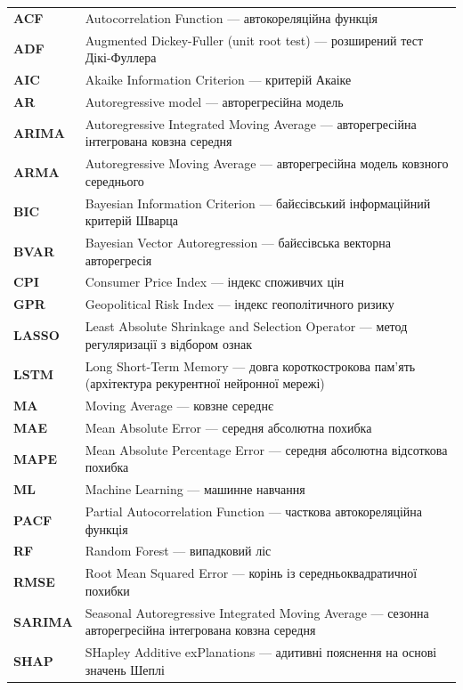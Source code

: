 \documentclass{bachelor_thesis}
\begin{document}
{
\noindent\begin{longtable}{@{}>{\bfseries}p{2.5cm}@{\hspace{0.5cm}}p{\dimexpr\textwidth-3.2cm\relax}@{}}
ACF      & Autocorrelation Function --- автокореляційна функція \\
ADF      & Augmented Dickey-Fuller (unit root test) --- розширений тест Дікі-Фуллера \\
AIC      & Akaike Information Criterion --- критерій Акаіке \\
AR       & Autoregressive model --- авторегресійна модель \\
ARIMA    & Autoregressive Integrated Moving Average --- авторегресійна інтегрована ковзна середня \\
ARMA     & Autoregressive Moving Average --- авторегресійна модель ковзного середнього \\
BIC      & Bayesian Information Criterion --- байєсівський інформаційний критерій Шварца \\
BVAR     & Bayesian Vector Autoregression --- байєсівська векторна авторегресія \\
CPI      & Consumer Price Index --- індекс споживчих цін \\
GPR      & Geopolitical Risk Index --- індекс геополітичного ризику \\
LASSO    & Least Absolute Shrinkage and Selection Operator --- метод регуляризації з відбором ознак \\
LSTM     & Long Short-Term Memory --- довга короткострокова пам'ять (архітектура рекурентної нейронної мережі) \\
MA       & Moving Average --- ковзне середнє \\
MAE      & Mean Absolute Error --- середня абсолютна похибка \\
MAPE     & Mean Absolute Percentage Error --- середня абсолютна відсоткова похибка \\
ML       & Machine Learning --- машинне навчання \\
PACF     & Partial Autocorrelation Function --- часткова автокореляційна функція \\
RF       & Random Forest --- випадковий ліс \\
RMSE     & Root Mean Squared Error --- корінь із середньоквадратичної похибки \\
SARIMA   & Seasonal Autoregressive Integrated Moving Average --- сезонна авторегресійна інтегрована ковзна середня \\
SHAP     & SHapley Additive exPlanations --- адитивні пояснення на основі значень Шеплі \\

\end{longtable}}
\end{document}
